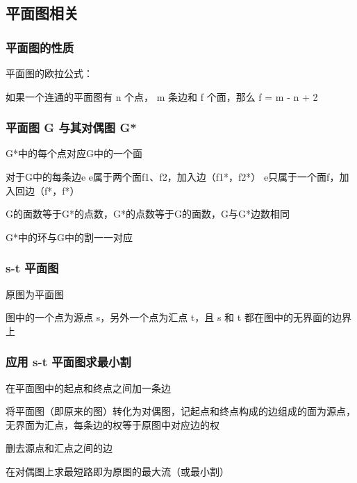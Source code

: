 \subsection{平面图相关}

\subsubsection{平面图的性质}

平面图的欧拉公式：

如果一个连通的平面图有 n 个点， m 条边和 f 个面，那么 f = m - n + 2

\subsubsection{平面图 G 与其对偶图 G*}

G*中的每个点对应G中的一个面

对于G中的每条边e
e属于两个面f1、f2，加入边（f1*，f2*）
e只属于一个面f，加入回边（f*，f*）

G的面数等于G*的点数，G*的点数等于G的面数，G与G*边数相同

G*中的环与G中的割一一对应

\subsubsection{s-t 平面图}

原图为平面图

图中的一个点为源点 s，另外一个点为汇点 t，且 s 和 t 都在图中的无界面的边界上

\subsubsection{应用 s-t 平面图求最小割}

在平面图中的起点和终点之间加一条边

将平面图（即原来的图）转化为对偶图，记起点和终点构成的边组成的面为源点，无界面为汇点，每条边的权等于原图中对应边的权

删去源点和汇点之间的边

在对偶图上求最短路即为原图的最大流（或最小割）
